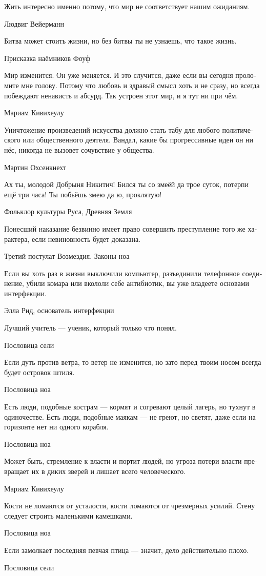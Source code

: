 \documentclass[a4paper,12pt,fleqn]{book}\usepackage{polyglossia}\setdefaultlanguage[babelshorthands=true]{russian}\setotherlanguage{english}\defaultfontfeatures{Ligatures=TeX,Mapping=tex-text}\usepackage{xcolor}\newcommand{\ml}[3]{#2}
\begin{document}
{\epigraph
{Жить интересно именно потому, что мир не соответствует нашим ожиданиям.}
{Людвиг Вейерманн}

\epigraph{
\ml{$0$}
{Битва может стоить жизни, но без битвы ты не узнаешь, что такое жизнь.}
{Battle may take your life, but escaping battle you'll never know what life is.}
}{Присказка наёмников Фоуф}

\epigraph
{Мир изменится.
Он уже меняется.
И это случится, даже если вы сегодня проломите мне голову.
Потому что любовь и здравый смысл хоть и не сразу, но всегда побеждают ненависть и абсурд.
Так устроен этот мир, и я тут ни при чём.}
{Мариам Кивихеулу}

\epigraph
{Уничтожение произведений искусства должно стать табу для любого политического или общественного деятеля.
Вандал, какие бы прогрессивные идеи он ни нёс, никогда не вызовет сочувствие у общества.}
{Мартин Охсенкнехт}

\epigraph
{Ах ты, молодой Добрыня Никитич!
Бился ты со змеёй да трое суток, потерпи ещё три часа!
Ты побьёшь змею да ю, проклятую!}
{Фольклор культуры Руса, Древняя Земля}

\epigraph
{Понесший наказание безвинно имеет право совершить преступление того же характера, если невиновность будет доказана.}
{Третий постулат Возмездия.
Законы ноа}

\epigraph
{Если вы хоть раз в жизни выключили компьютер, разъединили телефонное соединение, убили комара или вкололи себе антибиотик, вы уже владеете основами интерфекции.}
{Элла Рид, основатель интерфекции}

\epigraph
{Лучший учитель --- ученик, который только что понял.}
{Пословица сели}

\epigraph
{Если дуть против ветра, то ветер не изменится, но зато перед твоим носом всегда будет островок штиля.}
{Пословица ноа}

\epigraph
{Есть люди, подобные кострам --- кормят и согревают целый лагерь, но тухнут в одиночестве.
Есть люди, подобные маякам --- не греют, но светят, даже если на горизонте нет ни одного корабля.}
{Пословица ноа}

\epigraph
{Может быть, стремление к власти и портит людей, но угроза потери власти превращает их в диких зверей и лишает всего человеческого.}
{Мариам Кивихеулу}

\epigraph
{Кости не ломаются от усталости, кости ломаются от чрезмерных усилий.
Стену следует строить маленькими камешками.}
{Пословица ноа}

\epigraph
{Если замолкает последняя певчая птица --- значит, дело действительно плохо.}
{Пословица сели}

}
\end{document}
